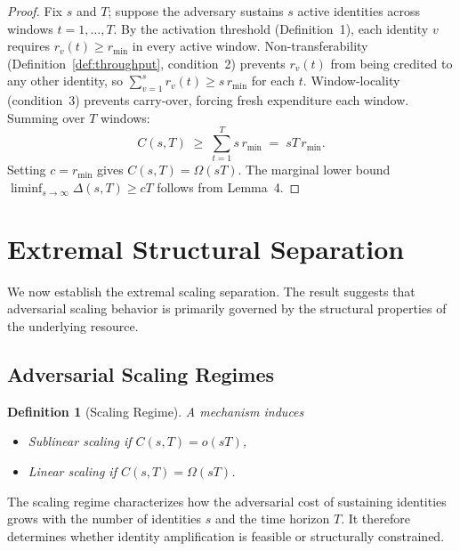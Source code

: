 \documentclass[journal]{IEEEtran}
\newtheorem{definition}{Definition}
\begin{document}
	\begin{proof}
		Fix $s$ and $T$; suppose the adversary sustains $s$ active
		identities across windows $t=1,\dots,T$.
		By the activation threshold (Definition~1), each identity $v$
		requires $r_v(t) \ge r_{\min}$ in every active window.
		Non-transferability (Definition~\ref{def:throughput}, condition~2)
		prevents $r_v(t)$ from being credited to any other identity,
		so $\sum_{v=1}^{s} r_v(t) \ge s\,r_{\min}$ for each $t$.
		Window-locality (condition~3) prevents carry-over, forcing
		fresh expenditure each window.
		Summing over $T$ windows:
		\[
		C(s,T) \;\ge\; \sum_{t=1}^{T} s\,r_{\min} \;=\; sT\,r_{\min}.
		\]
		Setting $c = r_{\min}$ gives $C(s,T)=\Omega(sT)$.
		The marginal lower bound
		$\liminf_{s\to\infty}\Delta(s,T) \ge cT$
		follows from Lemma~4.
	\end{proof}
	
	
	\section{Extremal Structural Separation}
	
	We now establish the extremal scaling separation.
	The result suggests that adversarial scaling behavior is
	primarily governed by the structural properties of the
	underlying resource.
	
	\subsection{Adversarial Scaling Regimes}
	
	\begin{definition}[Scaling Regime]
		
		A mechanism induces
		
		\begin{itemize}
			\item \emph{Sublinear scaling} if $C(s,T) = o(sT)$,
			\item \emph{Linear scaling} if $C(s,T) = \Omega(sT)$.
		\end{itemize}
		
	\end{definition}
	
	The scaling regime characterizes how the
	adversarial cost of sustaining identities grows
	with the number of identities $s$
	and the time horizon $T$.
	It therefore determines whether identity amplification
	is feasible or structurally constrained.
	
\end{document}
